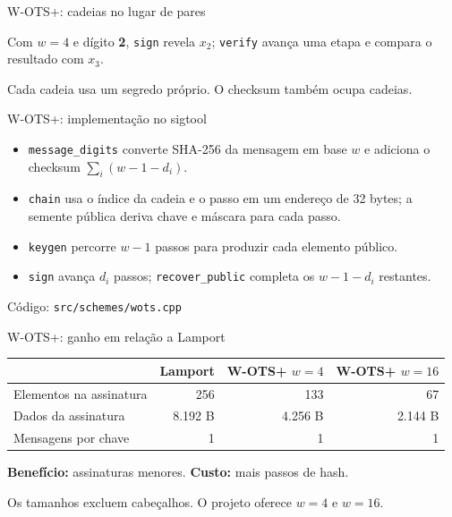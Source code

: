 \documentclass[aspectratio=169,11pt]{beamer}
\newcommand{\code}[1]{\texttt{#1}}
\newcommand{\src}[1]{\vfill{\scriptsize\color{muted} Código: \texttt{#1}}}
\begin{document}
\begin{frame}{W-OTS+: cadeias no lugar de pares}
\begin{center}
\end{center}
\vspace{0.3cm}
Com $w=4$ e dígito \textbf{2}, \code{sign} revela $x_2$; \code{verify} avança uma etapa e compara o resultado com $x_3$.

Cada cadeia usa um segredo próprio. O checksum também ocupa cadeias.
\end{frame}

\begin{frame}{W-OTS+: implementação no sigtool}
\begin{itemize}
\item \code{message\_digits} converte SHA-256 da mensagem em base $w$ e adiciona o checksum $\sum_i(w-1-d_i)$.
\item \code{chain} usa o índice da cadeia e o passo em um endereço de 32 bytes; a semente pública deriva chave e máscara para cada passo.
\item \code{keygen} percorre $w-1$ passos para produzir cada elemento público.
\item \code{sign} avança $d_i$ passos; \code{recover\_public} completa os $w-1-d_i$ restantes.
\end{itemize}
\src{src/schemes/wots.cpp}
\end{frame}

\begin{frame}{W-OTS+: ganho em relação a Lamport}
\begin{center}\renewcommand{\arraystretch}{1.5}
\begin{tabular}{lrrr}\toprule
 & Lamport & W-OTS+ $w=4$ & W-OTS+ $w=16$ \\\midrule
Elementos na assinatura & 256 & 133 & 67 \\
Dados da assinatura & 8.192 B & 4.256 B & 2.144 B \\
Mensagens por chave & 1 & 1 & 1 \\\bottomrule
\end{tabular}\end{center}
\textbf{Benefício:} assinaturas menores. \quad \textbf{Custo:} mais passos de hash.

Os tamanhos excluem cabeçalhos. O projeto oferece $w=4$ e $w=16$.
\end{frame}
\end{document}
